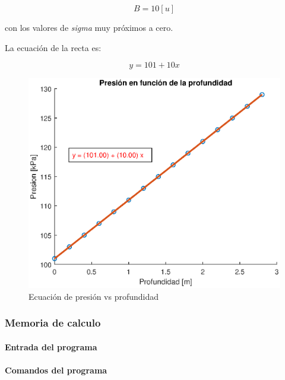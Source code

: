 \documentclass[letter,11pt]{article}
\begin{document}
\begin{equation}
    B = 10 [u]
\end{equation}

con los valores de \emph{sigma} muy próximos a cero.

La ecuación de la recta es:

\begin{equation}
    y = 101 + 10 x
\end{equation}

\begin{figure}[!h]
\centering
\includegraphics[scale=1.00]{resources/3.2.2.eps}
\caption{Ecuación de presión vs profundidad}
\label{practica42_2}
\end{figure}

\subsubsection{Memoria de calculo}

\paragraph{Entrada del programa}
\begin{alltt}
\footnotesize

\normalsize
\end{alltt}

\paragraph{Comandos del programa}
\begin{alltt}
\footnotesize

\normalsize
\end{alltt}
\end{document}

